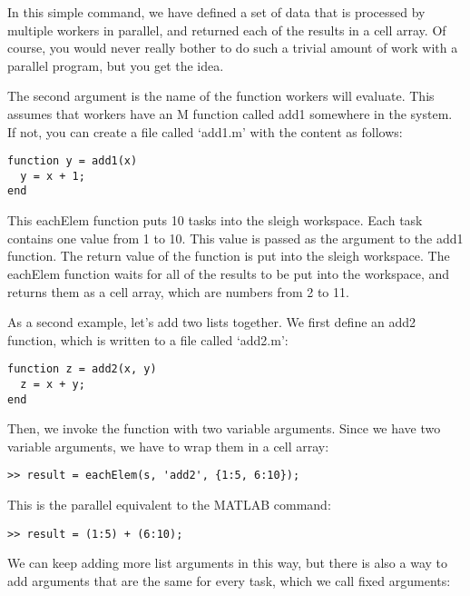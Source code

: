 In this simple command, we have defined a set of data that is processed
by multiple workers in parallel, and returned each of the results in a
cell array.  Of course, you would never really bother to do such a
trivial amount of work with a parallel program, but you get the idea.

The second argument is the name of the function workers will evaluate.
This assumes that workers have an M function called add1 somewhere in
the system.  If not, you can create a file called `add1.m' with the
content as follows:

\begin{samepage}
\begin{verbatim}
function y = add1(x)
  y = x + 1;
end
\end{verbatim}
\end{samepage}

This eachElem function puts 10 tasks into the sleigh workspace.  Each
task contains one value from 1 to 10.  This value is passed as the
argument to the add1 function.  The return value of the function is put
into the sleigh workspace.  The eachElem function waits for all of the
results to be put into the workspace, and returns them as a cell array,
which are numbers from 2 to 11.

As a second example, let's add two lists together.  We first define an
add2 function, which is written to a file called `add2.m':

\begin{samepage}
\begin{verbatim}
function z = add2(x, y)
  z = x + y;
end
\end{verbatim}
\end{samepage}

Then, we invoke the function with two variable arguments. Since we have two 
variable arguments, we have to wrap them in a cell array:

\begin{verbatim}
>> result = eachElem(s, 'add2', {1:5, 6:10});
\end{verbatim}

This is the parallel equivalent to the MATLAB command:

\begin{verbatim}
>> result = (1:5) + (6:10);
\end{verbatim}

We can keep adding more list arguments in this way, but there is also
a way to add arguments that are the same for every task, which we call
fixed arguments:

